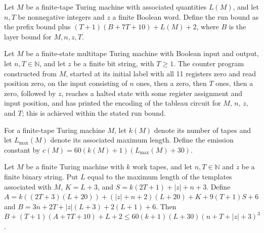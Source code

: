 \begin{definition}
\label{Complexity.UTab.runBound}
\leanok
{}
Let $M$ be a finite-tape Turing machine with associated quantities $L(M)$, and let $n,T$
be nonnegative integers and $z$ a finite Boolean word. Define the run bound as the
prefix bound plus $(T+1)(B+7T+10)+L(M)+2$, where $B$ is the layer bound for $M,n,z,T$.
\end{definition}

\begin{theorem}
\label{Complexity.UTab.goes_emit}
\leanok
{}
Let $M$ be a finite-state multitape Turing machine with Boolean input and output, let
$n,T\in\mathbb N$, and let $z$ be a finite bit string, with $T\ge 1$. The counter
program constructed from $M$, started at its initial label with all 11 registers zero
and read position zero, on the input consisting of $n$ ones, then a zero, then $T$ ones,
then a zero, followed by $z$, reaches a halted state with some register assignment and
input position, and has printed the encoding of the tableau circuit for $M$, $n$, $z$,
and $T$; this is achieved within the stated run bound.
\end{theorem}

\begin{definition}
\label{Complexity.UTab.emitC}
\leanok
{}
For a finite-tape Turing machine $M$, let $k(M)$ denote its number of tapes and let
$L_{\max}(M)$ denote its associated maximum length. Define the emission constant by
$c(M)=60(k(M)+1)(L_{\max}(M)+30)$.
\end{definition}

\begin{theorem}
\label{Complexity.UTab.runBound_le}
\leanok
{}
Let $M$ be a finite Turing machine with $k$ work tapes, and let $n,T\in\mathbb{N}$ and
$z$ be a finite binary string. Put $L$ equal to the maximum length of the templates
associated with $M$, $K=L+3$, and $S=k(2T+1)+|z|+n+3$. Define
$A=k((2T+3)(L+20))+(|z|+n+2)(L+20)+K+9(T+1)S+6$ and $B=3n+2T+|z|(L+3)+2(L+1)+6$. Then
$B+(T+1)(A+7T+10)+L+2\le 60(k+1)(L+30)(n+T+|z|+3)^3$.
\end{theorem}

